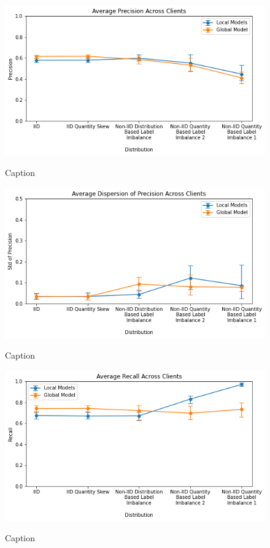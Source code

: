 \documentclass[letterpaper]{article} %
\begin{document}
\begin{figure}[hbt!]
{\includegraphics[width=\columnwidth]{Avg_precision_of_local_models_against_that_of_global_model}}
\caption{Caption}
\end{figure}

\begin{figure}[hbt!]
{\includegraphics[width=\columnwidth]{Avg_dispersion_of_precision_of_local_models_against_that_of_global_model}}
\caption{Caption}
\end{figure}

\begin{figure}[hbt!]
{\includegraphics[width=\columnwidth]{Avg_recall_of_local_models_against_that_of_global_model}}
\caption{Caption}
\end{figure}
\end{document}
